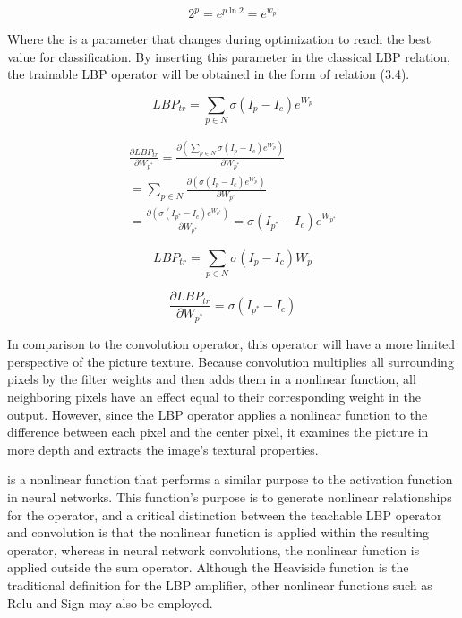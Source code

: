 \documentclass[journal]{IEEEtran}
\begin{document}
\begin{equation}\label{eq:expon}
	2^p=e^{p\ln{2}}=e^{w_p}
\end{equation}

Where the  is a parameter that changes during optimization to reach the best value for classification. By inserting this parameter in the classical LBP relation, the trainable LBP operator will be obtained in the form of relation (3.4).


\begin{equation}\label{eq:lbptr}
	LBP_{tr}=\sum_{p\in N}\sigma(I_p-I_c)e^{W_p} 
\end{equation}


\begin{multline}\label{eq:lbptrdif}
	\frac{\partial LBP_{tr}}{\partial W_{p^*}} 
	= \frac{\partial (\sum_{p\in N}\sigma(I_p-I_c)e^{W_p}) }{\partial W_{p^*}} 
	\\= \sum_{p\in N} {\frac{\partial (\sigma(I_p-I_c)e^{W_p}) }{\partial W_{p^*}} }
	\\= 	\frac{\partial (\sigma(I_{p^*}-I_c)e^{W_{p^*}})}{\partial W_{p^*}}
	= \sigma(I_{p^*}-I_c)e^{W_{p^*}}
	\nonumber
\end{multline}


\begin{equation}\label{eq:lbptrlin}
	LBP_{tr}=\sum_{p\in N}\sigma(I_p-I_c)W_p 
\end{equation}

\begin{equation}\label{eq:lbptrlindif}
	\frac{\partial LBP_{tr}}{\partial W_{p^*}}=
	\sigma(I_{p^*}-I_c)
\end{equation}

In comparison to the convolution operator, this operator will have a more limited perspective of the picture texture.
Because convolution multiplies all surrounding pixels by the filter weights and then adds them in a nonlinear function, all neighboring pixels have an effect equal to their corresponding weight in the output. However, since the LBP operator applies a nonlinear function to the difference between each pixel and the center pixel, it examines the picture in more depth and extracts the image's textural properties.

is a nonlinear function that performs a similar purpose to the activation function in neural networks. This function's purpose is to generate nonlinear relationships for the operator, and a critical distinction between the teachable LBP operator and convolution is that the nonlinear function is applied within the resulting operator, whereas in neural network convolutions, the nonlinear function is applied outside the sum operator.
Although the Heaviside function is the traditional definition for the LBP amplifier, other nonlinear functions such as Relu and Sign may also be employed.
\end{document}
